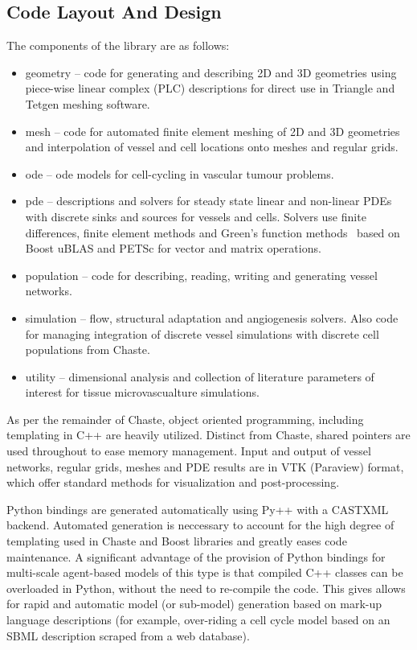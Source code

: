 \documentclass[10pt,letterpaper]{article}
\begin{document}
\subsection*{Code Layout And Design}

The components of the library are as follows:

\begin{itemize}
	\item geometry -- code for generating and describing 2D and 3D geometries using piece-wise linear complex (PLC) descriptions for direct use in Triangle and Tetgen meshing software.
	\item mesh -- code for automated finite element meshing of 2D and 3D geometries and interpolation of vessel and cell locations onto meshes and regular grids. 
	\item ode -- ode models for cell-cycling in vascular tumour problems.
	\item pde -- descriptions and solvers for steady state linear and non-linear PDEs with discrete sinks and sources for vessels and cells. Solvers use finite differences, finite element methods and Green's function methods~\cite{Secomb2013} based on Boost uBLAS and PETSc for vector and matrix operations.
	\item population -- code for describing, reading, writing and generating vessel networks.
	\item simulation -- flow, structural adaptation and angiogenesis solvers. Also code for managing integration of discrete vessel simulations with discrete cell populations from Chaste.
	\item utility -- dimensional analysis and collection of literature parameters of interest for tissue microvascualture simulations.	
\end{itemize}

As per the remainder of Chaste, object oriented programming, including templating in C++ are heavily utilized. Distinct from Chaste, shared pointers are used throughout to ease memory management. Input and output of vessel networks, regular grids, meshes and PDE results are in VTK (Paraview) format, which offer standard methods for visualization and post-processing. 

Python bindings are generated automatically using Py++ with a CASTXML backend. Automated generation is neccessary to account for the high degree of templating used in Chaste and Boost libraries and greatly eases code maintenance. A significant advantage of the provision of Python bindings for multi-scale agent-based models of this type is that compiled C++ classes can be overloaded in Python, without the need to re-compile the code. This gives allows for rapid and automatic model (or sub-model) generation based on mark-up language descriptions (for example, over-riding a cell cycle model based on an SBML description scraped from a web database).
\end{document}
